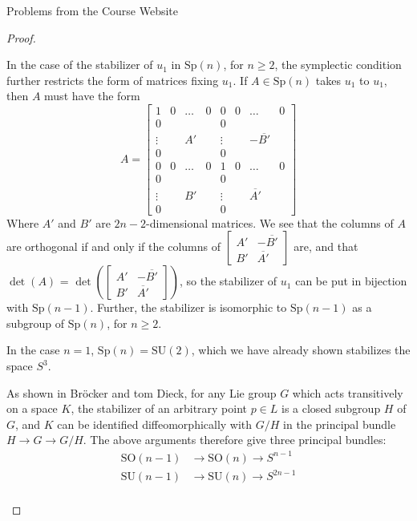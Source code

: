 \documentclass[12pt]{article}
\newcommand{\Sp}{\text{Sp}}
\theoremstyle{definition}
\newenvironment{problem}[2][Problem]{\begin{trivlist}
\item[\hskip \labelsep {\bfseries #1}\hskip \labelsep {\bfseries #2.}]}{\end{trivlist}}
\begin{document}
\begin{section}{Problems from the Course Website}
\begin{problem}{2}
\begin{proof}
\begin{enumerate}[label=(\alph*)]
	    \par In the case of the stabilizer of $u_1$ in $\Sp(n)$, for $n \geq 2$, the symplectic condition further restricts the form of matrices fixing $u_1.$ If $A \in \Sp(n)$ takes $u_1$ to $u_1$, then $A$ must have the form
	    \[A = \begin{bmatrix}
			    1      & 0 & \dots & 0 & 0      & 0 & \dots & 0\\
			    0      &   &       &   & 0      &   &       & \\
			    \vdots &   &  A'   &   & \vdots &   &  -\overline{B'}   & \\ 
			    0      &   &       &   & 0      &   &       & \\
			    0 &      0 & \dots & 0 & 1      & 0 & \dots & 0 \\
			    0      &   &       &   & 0      &   &       & \\
			    \vdots &   &  B'   &   & \vdots &   &  \overline{A'} & \\
			    0      &  &        &   & 0      &   &       & 
    \end{bmatrix}\]
    Where $A'$ and $B'$ are $2n - 2$-dimensional matrices. We see that the columns of $A$ are orthogonal if and only if the columns of $\begin{bmatrix}
	    A' & -\overline{B'}\\
	    B' & \overline{A'}
    \end{bmatrix}$ are, and that $\det(A)$ = $\det\left( \begin{bmatrix}
		    A' & -\overline{B'}\\
		    B' & \overline{A'}
    \end{bmatrix}\right)$, so the stabilizer of $u_1$ can be put in bijection with $\Sp(n-1)$. Further, the stabilizer is isomorphic to $\Sp(n-1)$ as a subgroup of $\Sp(n)$, for $n \geq 2$.
    \par In the case $n = 1$, $\Sp(n) = \text{SU}(2)$, which we have already shown stabilizes the space $S^3$.
    \par As shown in Br\"ocker and tom Dieck, for any Lie group $G$ which acts transitively on a space $K$, the stabilizer of an arbitrary point $p \in L$ is a closed subgroup $H$ of $G$, and $K$ can be identified diffeomorphically with $G/H$ in the principal bundle $H \to G \to G/H$. The above arguments therefore give three principal bundles:
    \begin{align*}
	    \text{SO}(n-1) &\to \text{SO}(n) \to S^{n-1}\\
	    \text{SU}(n-1) &\to \text{SU}(n) \to S^{2n-1}\\

\end{align*}
\end{enumerate}
\end{proof}
\end{problem}
\end{section}
\end{document}
